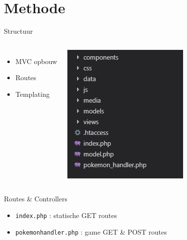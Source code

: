 \documentclass{beamer}
\begin{document}

\section{Methode}


\begin{frame}{Structuur}
	\begin{columns}
			\begin{itemize}
				\item MVC opbouw
				\item Routes
				\item Templating 
			\end{itemize}
			\includegraphics[scale=0.5]{Images/file_structure.jpg}
	\end{columns}
\end{frame}


\begin{frame}{Routes \& Controllers}
	
	\begin{itemize}
		\item \texttt{index.php} : statische GET routes
		\item \texttt{pokemon\textunderscore handler.php} : game GET \& POST routes
	\end{itemize}
\end{frame}

\end{document}
